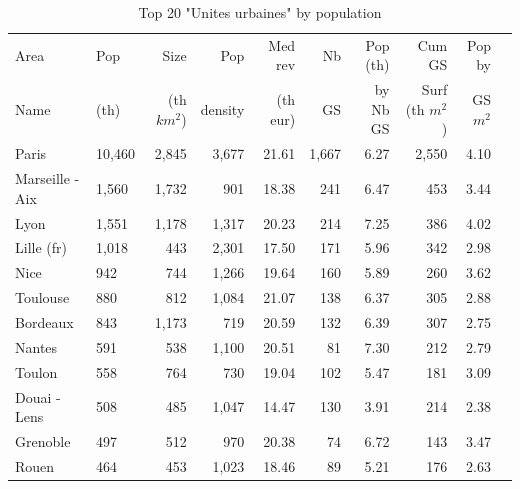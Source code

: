 \documentclass[11pt]{article}
\begin{document}
\begin{table}[H]
\caption{Top 20 "Unites urbaines" by population}
\small
\renewcommand{\arraystretch}{0.7}%

\begin{tabular}{llrrrrrrrr}
\toprule
Area             &      Pop   &   Size     &  Pop         & Med rev    & Nb         &  Pop (th)  & Cum GS          & Pop by       \\
Name             &      (th)  & (th $km^2$)&  density     & (th eur)   & GS         &  by Nb GS  & Surf (th $m^2$) & GS $m^2$  \\
\midrule
             Paris &     10,460 &      2,845 &        3,677 &      21.61 &      1,667 &       6.27 &      2,550 &        4.10 \\
   Marseille - Aix &      1,560 &      1,732 &          901 &      18.38 &        241 &       6.47 &        453 &        3.44 \\
              Lyon &      1,551 &      1,178 &        1,317 &      20.23 &        214 &       7.25 &        386 &        4.02 \\
        Lille (fr) &      1,018 &        443 &        2,301 &      17.50 &        171 &       5.96 &        342 &        2.98 \\
              Nice &        942 &        744 &        1,266 &      19.64 &        160 &       5.89 &        260 &        3.62 \\
          Toulouse &        880 &        812 &        1,084 &      21.07 &        138 &       6.37 &        305 &        2.88 \\
          Bordeaux &        843 &      1,173 &          719 &      20.59 &        132 &       6.39 &        307 &        2.75 \\
            Nantes &        591 &        538 &        1,100 &      20.51 &         81 &       7.30 &        212 &        2.79 \\
            Toulon &        558 &        764 &          730 &      19.04 &        102 &       5.47 &        181 &        3.09 \\
      Douai - Lens &        508 &        485 &        1,047 &      14.47 &        130 &       3.91 &        214 &        2.38 \\
          Grenoble &        497 &        512 &          970 &      20.38 &         74 &       6.72 &        143 &        3.47 \\
             Rouen &        464 &        453 &        1,023 &      18.46 &         89 &       5.21 &        176 &        2.63 \\

\end{tabular}
\end{table}
\end{document}
